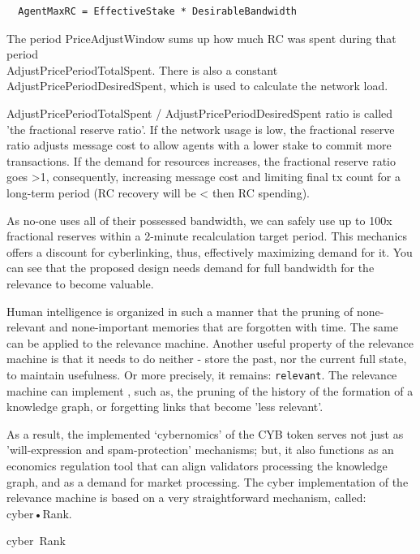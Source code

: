 \documentclass[8pt,oneside]{amsart}
\makeatletter
\newcommand{\linkgreen}[2]{\href{#1}{\color{green}{#2}}}
\renewcommand\subsection{\@startsection{subsection}
                                    {2}{\z@}
                                    {-3.25ex\@plus -1ex \@minus -.2ex}
                                    {0ex \@plus .2ex}
                                    {\play\Large}
                        }
\newcommand{\titleSection}[1]{\subsection{#1}}
\newcommand{\code}[1]{{\PlayBold #1}}
\makeatother
\begin{document}
\begin{lstlisting}
  AgentMaxRC = EffectiveStake * DesirableBandwidth
\end{lstlisting}

The period \code{PriceAdjustWindow} sums up how much RC was spent during that period\\ \code{AdjustPricePeriodTotalSpent}. There is also a constant \code{AdjustPricePeriodDesiredSpent}, which is used to calculate the network load.

\code{AdjustPricePeriodTotalSpent / AdjustPricePeriodDesiredSpent} ratio is called 'the fractional reserve ratio'. If the network usage is low, the fractional reserve ratio adjusts message cost to allow agents with a lower stake to commit more transactions. If the demand for resources increases, the fractional reserve ratio goes \code{>1}, consequently, increasing message cost and limiting final tx count for a long-term period (RC recovery will be \code{<} then RC spending).

As no-one uses all of their possessed bandwidth, we can safely use up to 100x fractional reserves within a 2-minute recalculation target period. This mechanics offers a discount for cyberlinking, thus, effectively maximizing demand for it. You can see that the proposed design needs demand for full bandwidth for the relevance to become valuable.

Human intelligence is organized in such a manner that the pruning of none-relevant and none-important memories that are forgotten with time. The same can be applied to the relevance machine. Another useful property of the relevance machine is that it needs to do neither - store the past, nor the current full state, to maintain usefulness. Or more precisely, it remains: \verb|relevant|. The relevance machine can implement \linkgreen{https://ipfs.io/ipfs/QmP81EcuNDZHQutvdcDjbQEqiTYUzU315aYaTyrVj6gtJb}{aggressive pruning strategies}, such as, the pruning of the history of the formation of a knowledge graph, or forgetting links that become 'less relevant'.

As a result, the implemented ‘cybernomics’ of the CYB token serves not just as 'will-expression and spam-protection' mechanisms; but, it also functions as an economics regulation tool that can align validators processing the knowledge graph, and as a demand for market processing. The \code{cyber} implementation of the relevance machine is based on a very straightforward mechanism, called: cyber•Rank.

\titleSection{cyber~Rank}\label{cyberRank}
\end{document}
